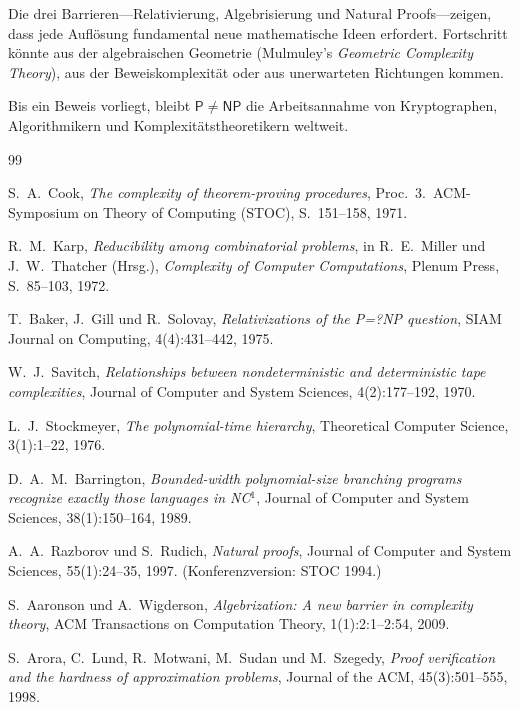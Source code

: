 \documentclass[12pt,a4paper]{amsart}
\theoremstyle{definition}
\newcommand{\Pclass}{\mathsf{P}}
\newcommand{\NP}{\mathsf{NP}}
\begin{document}
Die drei Barrieren---Relativierung, Algebrisierung und Natural Proofs---zeigen,
dass jede Auflösung fundamental neue mathematische Ideen erfordert.  Fortschritt
könnte aus der algebraischen Geometrie (Mulmuley's \emph{Geometric Complexity
Theory}), aus der Beweiskomplexität oder aus unerwarteten Richtungen kommen.

Bis ein Beweis vorliegt, bleibt $\Pclass\neq\NP$ die Arbeitsannahme von
Kryptographen, Algorithmikern und Komplexitätstheoretikern weltweit.

\begin{thebibliography}{99}

S.~A.\ Cook,
\textit{The complexity of theorem-proving procedures},
Proc.\ 3.\ ACM-Symposium on Theory of Computing (STOC), S.~151--158, 1971.

R.~M.\ Karp,
\textit{Reducibility among combinatorial problems},
in R.~E.\ Miller und J.~W.\ Thatcher (Hrsg.), \textit{Complexity of Computer
Computations}, Plenum Press, S.~85--103, 1972.

T.~Baker, J.~Gill und R.~Solovay,
\textit{Relativizations of the P=?NP question},
SIAM Journal on Computing, 4(4):431--442, 1975.

W.~J.\ Savitch,
\textit{Relationships between nondeterministic and deterministic tape complexities},
Journal of Computer and System Sciences, 4(2):177--192, 1970.

L.~J.\ Stockmeyer,
\textit{The polynomial-time hierarchy},
Theoretical Computer Science, 3(1):1--22, 1976.

D.~A.\ M.\ Barrington,
\textit{Bounded-width polynomial-size branching programs recognize exactly those
languages in NC$^1$},
Journal of Computer and System Sciences, 38(1):150--164, 1989.

A.~A.\ Razborov und S.~Rudich,
\textit{Natural proofs},
Journal of Computer and System Sciences, 55(1):24--35, 1997.
(Konferenzversion: STOC 1994.)

S.~Aaronson und A.~Wigderson,
\textit{Algebrization: A new barrier in complexity theory},
ACM Transactions on Computation Theory, 1(1):2:1--2:54, 2009.

S.~Arora, C.~Lund, R.~Motwani, M.~Sudan und M.~Szegedy,
\textit{Proof verification and the hardness of approximation problems},
Journal of the ACM, 45(3):501--555, 1998.


\end{thebibliography}
\end{document}
